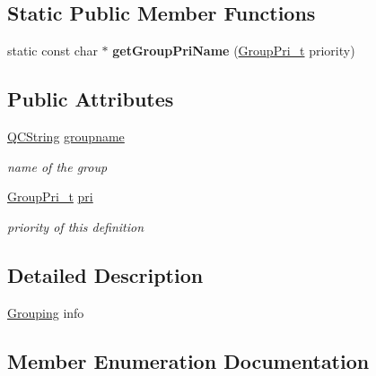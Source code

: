 \subsection*{Static Public Member Functions}
\begin{DoxyCompactItemize}
\item 
\mbox{\label{struct_grouping_ae38a9f0b7428a2539810e4e782a740af}} 
static const char $\ast$ {\bfseries get\+Group\+Pri\+Name} (\mbox{\hyperlink{struct_grouping_a9f0ec5ab376b083ebe3274ea79fd2d70}{Group\+Pri\+\_\+t}} priority)
\end{DoxyCompactItemize}
\subsection*{Public Attributes}
\begin{DoxyCompactItemize}
\item 
\mbox{\label{struct_grouping_a05e6a053a86cc2f588d065f3880801dc}} 
\mbox{\hyperlink{class_q_c_string}{Q\+C\+String}} \mbox{\hyperlink{struct_grouping_a05e6a053a86cc2f588d065f3880801dc}{groupname}}
\begin{DoxyCompactList}\small\item\em name of the group \end{DoxyCompactList}\item 
\mbox{\label{struct_grouping_aead55d7198ceffe16cb82d2c114e4254}} 
\mbox{\hyperlink{struct_grouping_a9f0ec5ab376b083ebe3274ea79fd2d70}{Group\+Pri\+\_\+t}} \mbox{\hyperlink{struct_grouping_aead55d7198ceffe16cb82d2c114e4254}{pri}}
\begin{DoxyCompactList}\small\item\em priority of this definition \end{DoxyCompactList}\end{DoxyCompactItemize}


\subsection{Detailed Description}
\mbox{\hyperlink{struct_grouping}{Grouping}} info 

\subsection{Member Enumeration Documentation}
\mbox{\label{struct_grouping_a9f0ec5ab376b083ebe3274ea79fd2d70}} 
